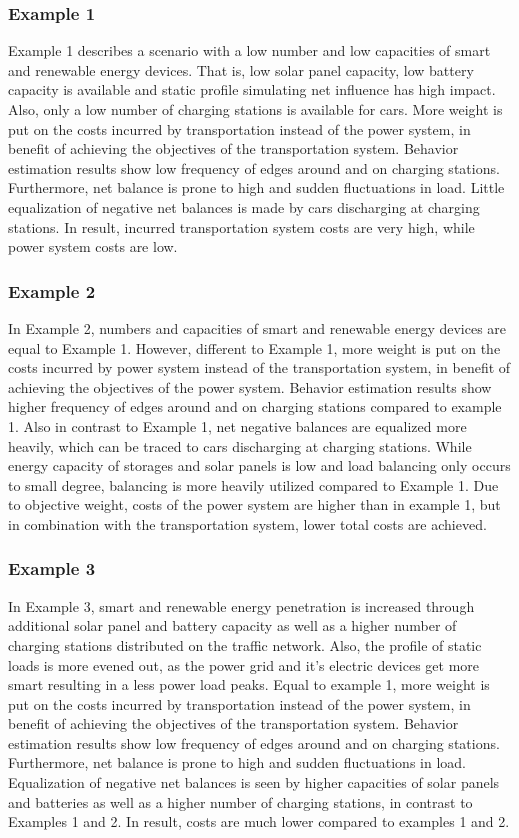 \subsubsection{Example 1}
Example 1 describes a scenario with a low number and low capacities of smart and renewable energy devices. That is, low solar panel capacity, low battery capacity is available and static profile simulating net influence has high impact. Also, only a low number of charging stations is available for cars. More weight is put on the costs incurred by transportation instead of the power system, in benefit of achieving the objectives of the transportation system. Behavior estimation results show low frequency of edges around and on charging stations. Furthermore, net balance is prone to high and sudden fluctuations in load. Little equalization of negative net balances is made by cars discharging at charging stations. In result, incurred transportation system costs are very high, while power system costs are low.

\subsubsection{Example 2}

In Example 2, numbers and capacities of smart and renewable energy devices are equal to Example 1. However, different to Example 1, more weight is put on the costs incurred by power system instead of the transportation system, in benefit of achieving the objectives of the power system. Behavior estimation results show higher frequency of edges around and on charging stations compared to example 1. Also in contrast to Example 1, net negative balances are equalized more heavily, which can be traced to cars discharging at charging stations. While energy capacity of storages and solar panels is low and load balancing only occurs to small degree, balancing is more heavily utilized compared to Example 1. Due to objective weight, costs of the power system are higher than in example 1, but in combination with the transportation system, lower total costs are achieved.

\subsubsection{Example 3}

In Example 3, smart and renewable energy penetration is increased through additional solar panel and battery capacity as well as a higher number of charging stations distributed on the traffic network. Also, the profile of static loads is more evened out, as the power grid and it's electric devices get more smart resulting in a less power load peaks. 
Equal to example 1, more weight is put on the costs incurred by transportation instead of the power system, in benefit of achieving the objectives of the transportation system. Behavior estimation results show low frequency of edges around and on charging stations. Furthermore, net balance is prone to high and sudden fluctuations in load. Equalization of negative net balances is seen by higher capacities of solar panels and batteries as well as a higher number of charging stations, in contrast to Examples 1 and 2. In result, costs are much lower compared to examples 1 and 2.

